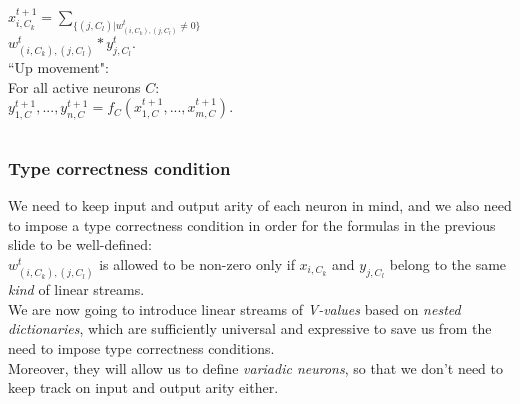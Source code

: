 \documentclass{beamer}
\newcommand{\msgray}[1]{{\color{mygray} #1}}
\begin{document}
\begin{frame}
\begin{columns}[T]
\begin{column}{0.3\textwidth}
{{\scriptsize$x_{i,C_k}^{t+1} = \sum_{\{(j,C_l) | w_{(i,C_k), (j,C_l)}^t \neq 0\}}$\\[0.1ex]$w_{(i,C_k), (j,C_l)}^t * y_{j, C_l}^{t}.$}\\[3ex]

``Up movement":\\[0.1ex]  

For all active neurons $C$:\\[1ex]

{\scriptsize $y^{t+1}_{1,C},...,y^{t+1}_{n,C} = f_C (x^{t+1}_{1,C},...,x^{t+1}_{m,C})$.}
}

\end{column}
\end{columns}


\end{frame}





\begin{frame}

  \frametitle{Type correctness condition}

We need to keep input and output arity of each neuron in mind, and we also need to impose a type correctness condition in order for the formulas in the previous slide to be well-defined:\\[2ex]


$w_{(i,C_k), (j,C_l)}^t$ is allowed to be
non-zero only if $x_{i,C_k}$ and $y_{j, C_l}$ belong to the same {\em kind} of linear streams.\\[4ex]

\msgray{We are now going to introduce linear streams of {\em V-values} based on {\em nested dictionaries}, which are sufficiently universal and expressive to save us from the need to impose type correctness conditions.\\[2ex]

Moreover, they will allow us to define {\em variadic neurons}, so that we don't need to keep track on input and output
arity either.}

\end{frame}
\end{document}
